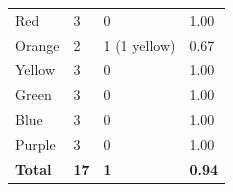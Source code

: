 \documentclass[twoside]{IEEEtran}
\begin{document}
\begin{table}[!b]
\begin{minipage}{\columnwidth}
\begin{tabular}{ l l l l }
            \midrule
            Red             & 3                    & 0                       & 1.00                   \\
            Orange          & 2                    & 1 (1 yellow)            & 0.67                   \\
            Yellow          & 3                    & 0                       & 1.00                   \\
            Green           & 3                    & 0                       & 1.00                   \\
            Blue            & 3                    & 0                       & 1.00                   \\
            Purple          & 3                    & 0                       & 1.00                   \\
            \midrule
            \bfseries Total & \bfseries 17         & \bfseries 1             & \bfseries 0.94         \\
            \bottomrule
        \end{tabular}
    \end{minipage}

    \bigskip


\end{table}
\end{document}
